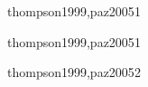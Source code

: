 \begin{syllabus}
\begin{unit}{\PLONEDef}{thompson1999,paz2005}{1}
   \begin{topics}
      \item \PLONETopicHistoria
   \end{topics}

   \begin{unitgoals}
      \item \PLONEObjONE
      \item \PLONEObjTWO
   \end{unitgoals}
\end{unit}

\begin{unit}{\PLFOURDef}{thompson1999,paz2005}{1}

   \begin{topics}
      \item \PLFOURTopicDeclaracion
      \item \PLFOURTopicVista
      \item \PLFOURTopicRecoleccion
   \end{topics}

   \begin{unitgoals}
      \item \PLFOURObjONE
      \item \PLFOURObjTWO
      \item \PLFOURObjTHREE
      \item \PLFOURObjFOUR
      \item \PLFOURObjFIVE
   \end{unitgoals}

\end{unit}

\begin{unit}{\PFONEDef}{thompson1999,paz2005}{2}
   \begin{topics}
      \item \PFONETopicSintaxis
      \item \PFONETopicVariables
      \item \PFONETopicEntrada
      \item \PFONETopicEstructuras
      \item \PFONETopicFunciones
      \item \PFONETopicDescomposicion
   \end{topics}
   \begin{unitgoals}
      \item \PFONEObjONE
      \item \PFONEObjTWO
      \item \PFONEObjTHREE
      \item \PFONEObjFOUR
      \item \PFONEObjFIVE
   \end{unitgoals}
\end{unit}


\end{syllabus}
